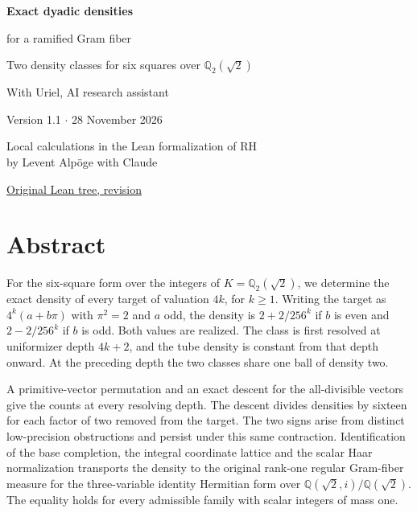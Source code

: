\documentclass[12pt,letterpaper]{article}
\newcommand{\code}[1]{\texttt{\detokenize{#1}}}
\begin{document}
\thispagestyle{empty}
\begin{center}\par\vspace{.46in}
{\fontsize{30}{35}\selectfont\bfseries\color{ink}Exact dyadic densities\par for a ramified Gram fiber}\par\vspace{.23in}
\begin{minipage}{.87\linewidth}\centering\Large Two density classes for six squares over $\mathbb Q_2(\sqrt2)$\end{minipage}
\par\vspace{.35in}
\par\vspace{.45in}{\large Justin Candler}\par With Uriel, AI research assistant\par Version 1.1 $\cdot$ 28 November 2026\end{center}\vfill
\begin{center}\sffamily Local calculations in the Lean formalization of RH\\by Levent Alp\"oge with Claude\par\small \href{https://github.com/leanprover-community/riemann-hypothesis/tree/40e56bab026552e089d7afcfeff08d2defb9c005}{Original Lean tree, revision \code{40e56bab}}\end{center}
\clearpage\section*{Abstract}

For the six-square form over the integers of $K=\mathbb Q_2(\sqrt2)$, we determine the exact density of every target of valuation $4k$, for $k\ge1$. Writing the target as $4^k(a+b\pi)$ with $\pi^2=2$ and $a$ odd, the density is $2+2/256^k$ if $b$ is even and $2-2/256^k$ if $b$ is odd. Both values are realized. The class is first resolved at uniformizer depth $4k+2$, and the tube density is constant from that depth onward. At the preceding depth the two classes share one ball of density two.

A primitive-vector permutation and an exact descent for the all-divisible vectors give the counts at every resolving depth. The descent divides densities by sixteen for each factor of two removed from the target. The two signs arise from distinct low-precision obstructions and persist under this same contraction. Identification of the base completion, the integral coordinate lattice and the scalar Haar normalization transports the density to the original rank-one regular Gram-fiber measure for the three-variable identity Hermitian form over $\mathbb Q(\sqrt2,i)/\mathbb Q(\sqrt2)$. The equality holds for every admissible family with scalar integers of mass one.
\end{document}
